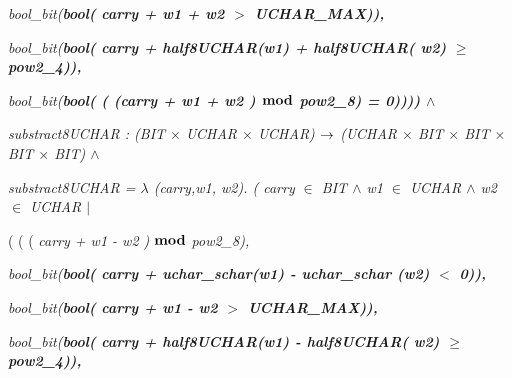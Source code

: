 \documentclass[11pt]{article}
\begin{document}
\begin{sloppypar}
\hspace*{0.60in}\it bool\_bit\rm (\bf bool\rm ( \it carry \rm + \it w1 \rm + \it w2 $>$ \it UCHAR\_MAX\rm )\rm )\rm ,

\hspace*{0.60in}\it bool\_bit\rm (\bf bool\rm ( \it carry \rm + \it half8UCHAR\rm (\it w1\rm ) \rm + \it half8UCHAR\rm ( \it w2\rm )  $\geq$  \it pow2\_4\rm )\rm )\rm ,

\hspace*{0.60in}\it bool\_bit\rm (\bf bool\rm ( \rm ( \rm (\it carry \rm + \it w1 \rm + \it w2 \rm )  $\mod$  \it pow2\_8\rm ) \rm = \rm 0\rm )\rm )\hspace*{0.10in}\rm )\rm )\hspace*{0.10in} $\land$ 

\hspace*{0.20in}

\hspace*{0.20in}

\hspace*{0.20in} 

\hspace*{0.20in}\it substract8UCHAR \rm : \rm (\it BIT  $\times$  \it UCHAR  $\times$  \it UCHAR\rm )  $\fun$  \rm (\it UCHAR  $\times$  \it BIT  $\times$  \it BIT  $\times$  \it BIT  $\times$  \it BIT\rm )  $\land$ 

\hspace*{0.20in}\it substract8UCHAR \rm =  $\lambda$  \rm (\it carry\rm ,\it w1\rm , \it w2\rm )\rm . \rm ( \it carry  $\in$  \it BIT  $\land$  \it w1  $\in$  \it UCHAR  $\land$  \it w2  $\in$  \it UCHAR\hspace*{0.15in} $\mid$ 

\hspace*{0.40in}\rm ( \rm ( \rm ( \it carry \rm + \it w1 \rm - \it w2 \rm )  $\mod$  \it pow2\_8\rm )\hspace*{0.15in}\rm ,\hspace*{0.10in}

\hspace*{0.60in}\it bool\_bit\rm (\bf bool\rm ( \it carry \rm + \it uchar\_schar\rm (\it w1\rm ) \rm - \it uchar\_schar \rm (\it w2\rm ) $<$ \rm 0\rm )\rm )\hspace*{0.20in}\rm ,

\hspace*{0.60in}\it bool\_bit\rm (\bf bool\rm ( \it carry \rm + \it w1 \rm - \it w2 $>$ \it UCHAR\_MAX\rm )\rm )\rm ,

\hspace*{0.60in}\it bool\_bit\rm (\bf bool\rm ( \it carry \rm + \it half8UCHAR\rm (\it w1\rm ) \rm - \it half8UCHAR\rm ( \it w2\rm )  $\geq$  \it pow2\_4\rm )\rm )\rm ,


\end{sloppypar}
\end{document}
